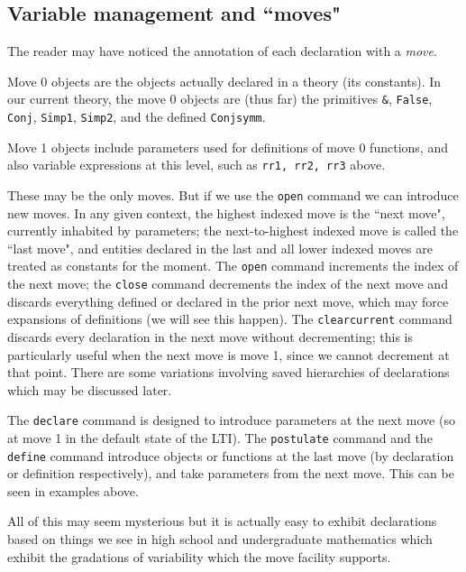 \documentclass[12pt]{article}
\begin{document}
\newpage

\subsection{Variable management and ``moves"}

The reader may have noticed the annotation of each declaration with a {\em move\/}.

Move 0 objects are the objects actually declared in a theory (its constants).  In our current theory, the move 0 objects
are (thus far) the primitives \verb|&|, {\tt False}, {\tt Conj}, {\tt Simp1}, {\tt Simp2}, and the defined {\tt Conjsymm}.

Move 1 objects include parameters used for definitions of move 0 functions, and also variable expressions at this level,
such as {\tt rr1, rr2, rr3} above.

These may be the only moves.  But if we use the {\tt open} command we can introduce new moves.  In any given context,
the highest indexed move is the ``next move", currently inhabited by parameters;  the next-to-highest indexed move is called the ``last move", and entities declared in the last and all lower indexed moves are treated as constants for the moment.  The {\tt open} command increments the index of the next move;  the {\tt close} command decrements the index of the next move and discards everything defined or declared in the prior next move, which may force expansions of definitions (we will see this happen).
The {\tt clearcurrent} command discards every declaration in the next move without decrementing;  this is particularly useful when the next move is move 1, since we cannot decrement at that point.  There are some variations involving saved hierarchies of declarations which may be discussed later.

The {\tt declare} command is designed to introduce parameters at the next move (so at move 1 in the default state of the LTI).  The {\tt postulate} command and the {\tt define} command introduce objects or functions at the last move (by declaration or definition respectively), and take parameters from the next move.  This can be seen in examples above.

All of this may seem mysterious but it is actually easy to exhibit declarations based on things we see in high school and undergraduate mathematics which exhibit the gradations of variability which the move facility supports.
\end{document}

